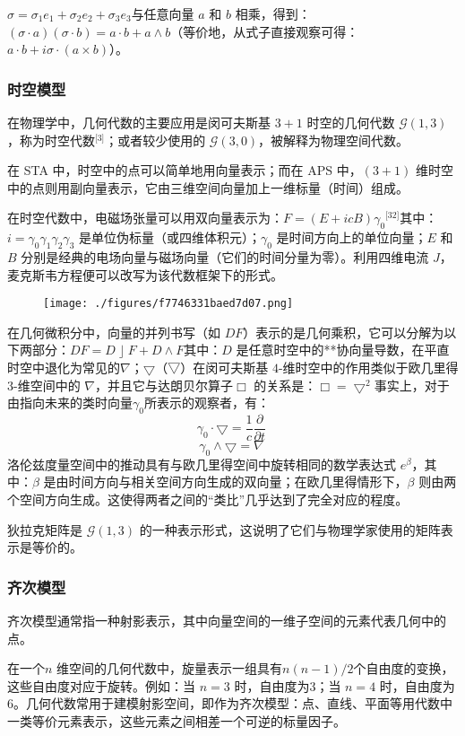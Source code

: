 $\sigma = \sigma_{1}e_{1} + \sigma_{2}e_{2} + \sigma_{3}e_{3}
$与任意向量 $a$ 和 $b$ 相乘，得到：$(\sigma \cdot a)(\sigma \cdot b) = a \cdot b + a \wedge b$（等价地，从式子直接观察可得：$
a \cdot b + i \sigma \cdot (a \times b)$）。  
\subsubsection{时空模型}
在物理学中，几何代数的主要应用是闵可夫斯基 $3+1$ 时空的几何代数 $\mathcal{G}(1,3)$，称为时空代数\(^\text{[3]}\)；或者较少使用的 $\mathcal{G}(3,0)$，被解释为物理空间代数。

在 STA 中，时空中的点可以简单地用向量表示；而在 APS 中，$(3+1)$ 维时空中的点则用副向量表示，它由三维空间向量加上一维标量（时间）组成。

在时空代数中，电磁场张量可以用双向量表示为：$F= (E+icB)\gamma_0$\(^\text{[32]}\)其中：$i = \gamma_0\gamma_1\gamma_2\gamma_3$ 是单位伪标量（或四维体积元）；$\gamma_0$ 是时间方向上的单位向量；$E$ 和 $B$ 分别是经典的电场向量与磁场向量（它们的时间分量为零）。利用四维电流 $J$，麦克斯韦方程便可以改写为该代数框架下的形式。
\begin{figure}[ht]
\centering
\texttt{[image: ./figures/f7746331baed7d07.png]}
\caption{} \label{fig_jiheds_4}
\end{figure}
在几何微积分中，向量的并列书写（如 $DF$）表示的是几何乘积，它可以分解为以下两部分：$DF = D \;\rfloor\; F + D \wedge F$其中：$D$ 是任意时空中的**协向量导数，在平直时空中退化为常见的$\nabla$；$\bigtriangledown$（▽）在闵可夫斯基 $4$-维时空中的作用类似于欧几里得 $3$-维空间中的 $\nabla$，并且它与达朗贝尔算子$\Box$ 的关系是：$\Box = \bigtriangledown^2$事实上，对于由指向未来的类时向量$\gamma_0$所表示的观察者，有：
$$
\gamma_0 \cdot \bigtriangledown = \frac{1}{c} \frac{\partial}{\partial t}~
$$
$$
\gamma_0 \wedge \bigtriangledown = \nabla~
$$
洛伦兹度量空间中的推动具有与欧几里得空间中旋转相同的数学表达式 $e^{\beta}$，其中：$\beta$ 是由时间方向与相关空间方向生成的双向量；在欧几里得情形下，$\beta$ 则由两个空间方向生成。这使得两者之间的“类比”几乎达到了完全对应的程度。

狄拉克矩阵是 $\mathcal{G}(1,3)$ 的一种表示形式，这说明了它们与物理学家使用的矩阵表示是等价的。
\subsubsection{齐次模型}
齐次模型通常指一种射影表示，其中向量空间的一维子空间的元素代表几何中的点。

在一个$n$ 维空间的几何代数中，旋量表示一组具有$n(n-1)/2$个自由度的变换，这些自由度对应于旋转。例如：当 $n = 3$ 时，自由度为3；当 $n = 4$ 时，自由度为6。几何代数常用于建模射影空间，即作为齐次模型：点、直线、平面等用代数中一类等价元素表示，这些元素之间相差一个可逆的标量因子。

